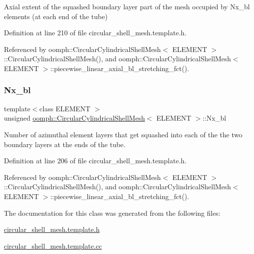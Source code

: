Axial extent of the squashed boundary layer part of the mesh occupied by Nx\+\_\+bl elements (at each end of the tube) 



Definition at line 210 of file circular\+\_\+shell\+\_\+mesh.\+template.\+h.



Referenced by oomph\+::\+Circular\+Cylindrical\+Shell\+Mesh$<$ E\+L\+E\+M\+E\+N\+T $>$\+::\+Circular\+Cylindrical\+Shell\+Mesh(), and oomph\+::\+Circular\+Cylindrical\+Shell\+Mesh$<$ E\+L\+E\+M\+E\+N\+T $>$\+::piecewise\+\_\+linear\+\_\+axial\+\_\+bl\+\_\+stretching\+\_\+fct().

\mbox{\label{classoomph_1_1CircularCylindricalShellMesh_a1a7ed3a5cd4c03c6254e5a8a0d3e532a}} 
\subsubsection{\texorpdfstring{Nx\+\_\+bl}{Nx\_bl}}
{\footnotesize\ttfamily template$<$class E\+L\+E\+M\+E\+NT $>$ \\
unsigned \hyperlink{classoomph_1_1CircularCylindricalShellMesh}{oomph\+::\+Circular\+Cylindrical\+Shell\+Mesh}$<$ E\+L\+E\+M\+E\+NT $>$\+::Nx\+\_\+bl\hspace{0.3cm}{\ttfamily [private]}}



Number of azimuthal element layers that get squashed into each of the the two boundary layers at the ends of the tube. 



Definition at line 206 of file circular\+\_\+shell\+\_\+mesh.\+template.\+h.



Referenced by oomph\+::\+Circular\+Cylindrical\+Shell\+Mesh$<$ E\+L\+E\+M\+E\+N\+T $>$\+::\+Circular\+Cylindrical\+Shell\+Mesh(), and oomph\+::\+Circular\+Cylindrical\+Shell\+Mesh$<$ E\+L\+E\+M\+E\+N\+T $>$\+::piecewise\+\_\+linear\+\_\+axial\+\_\+bl\+\_\+stretching\+\_\+fct().



The documentation for this class was generated from the following files\+:\begin{DoxyCompactItemize}
\item 
\hyperlink{circular__shell__mesh_8template_8h}{circular\+\_\+shell\+\_\+mesh.\+template.\+h}\item 
\hyperlink{circular__shell__mesh_8template_8cc}{circular\+\_\+shell\+\_\+mesh.\+template.\+cc}\end{DoxyCompactItemize}
